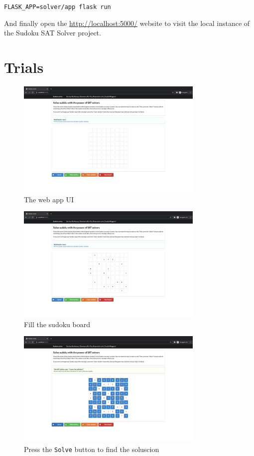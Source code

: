 \documentclass[]{usiinfprospectus}
\begin{document}
\begin{center}
\texttt{FLASK\_APP=solver/app flask run}
\end{center}

\noindent
And finally open the \url{http://localhost:5000/} website to visit the local
instance of the Sudoku SAT Solver project.


\section{Trials}\label{trials}


\begin{figure}
\caption{The web app UI}
\centering
\includegraphics[width=0.8\textwidth]{pics/app_ui.png}
\end{figure}

\begin{figure}
\caption{Fill the sudoku board}
\centering
\includegraphics[width=0.8\textwidth]{pics/fill_board.png}
\end{figure}

\begin{figure}
\caption{Press the \texttt{Solve} button to find the soluscion}
\centering
\includegraphics[width=0.8\textwidth]{pics/solved.png}
\end{figure}
\end{document}
